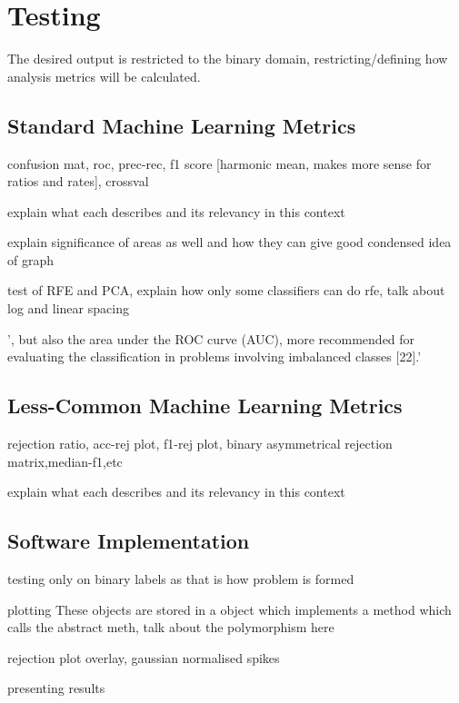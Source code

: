 \section{Testing}
\label{sec:pl-test}
    The desired output is restricted to the binary domain, restricting/defining how analysis metrics will be calculated.
    \subsection{Standard Machine Learning Metrics}
    \label{subsec:pl-test-stan}
        \begin{sitemize}
            \item{confusion mat, roc, prec-rec, f1 score [harmonic mean, makes more sense for ratios and rates], crossval}
            \item{explain what each describes and its relevancy in this context}
            \item{explain significance of areas as well and how they can give good condensed idea of graph}
            \item{test of RFE and PCA, explain how only some classifiers can do rfe, talk about log and linear spacing}
            \item{', but also the area under the ROC curve (AUC), more recommended for evaluating the classification in problems involving imbalanced classes [22].'}
        \end{sitemize}
        
    \subsection{Less-Common Machine Learning Metrics}
    \label{subsec:pl-test-less}
        \begin{sitemize}
            \item{rejection ratio, acc-rej plot, f1-rej plot, binary asymmetrical rejection matrix,median-f1,etc}
            \item{explain what each describes and its relevancy in this context}
        \end{sitemize}
    
    \subsection{Software Implementation}
    \label{subsec:pl-test-software}
        \begin{sitemize}
            \item{testing only on binary labels as that is how problem is formed}
            \item{plotting
            These objects are stored in a  object which implements a  method which calls the abstract meth, talk about the polymorphism here}
            \item{rejection plot overlay, gaussian normalised spikes}
            \item{presenting results}
        \end{sitemize}